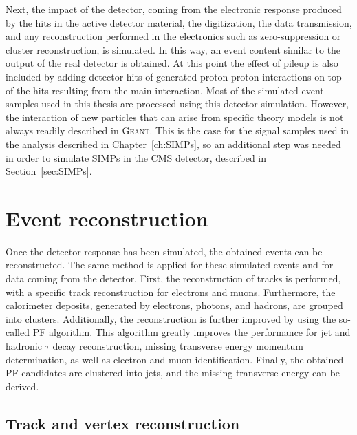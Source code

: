 Next, the impact of the detector, coming from the electronic response produced by the hits in the active detector material, the digitization, the data transmission, and any reconstruction performed in the electronics such as zero-suppression or cluster reconstruction, is simulated. In this way, an event content similar to the output of the real detector is obtained. At this point the effect of pileup is also included by adding detector hits of generated proton-proton interactions on top of the hits resulting from the main interaction. Most of the simulated event samples used in this thesis are processed using this detector simulation. However, the interaction of new particles that can arise from specific theory models is not always readily described in \textsc{Geant}. This is the case for the signal samples used in the analysis described in Chapter~\ref{ch:SIMPs}, so an additional step was needed in order to simulate \acfp{SIMP} in the \ac{CMS} detector, described in Section~\ref{sec:SIMPs}. 

\section{Event reconstruction}
\label{sec:reconstruction}

Once the detector response has been simulated, the obtained events can be reconstructed. The same method is applied for these simulated events and for data coming from the detector. First, the reconstruction of tracks is performed, with a specific track reconstruction for electrons and muons. Furthermore, the calorimeter deposits, generated by electrons, photons, and hadrons, are grouped into clusters. Additionally, the reconstruction is further improved by using the so-called \acf{PF} algorithm. This algorithm greatly improves the performance for jet and hadronic $\tau$ decay reconstruction, missing transverse energy momentum determination, as well as electron and muon identification. Finally, the obtained \ac{PF} candidates are clustered into jets, and the missing transverse energy can be derived.

\subsection{Track and vertex reconstruction}
\label{sec:tracking}

